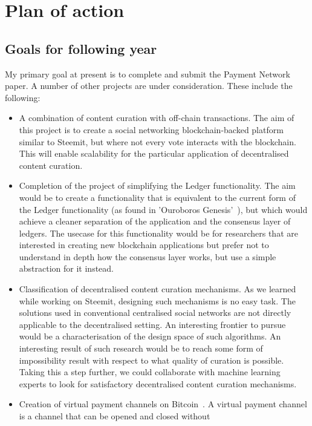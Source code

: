 \section{Plan of action}
  \subsection{Goals for following year}
    My primary goal at present is to complete and submit the Payment Network
    paper. A number of other projects are under consideration. These include the
    following:
    \begin{itemize}
      \item A combination of content curation with off-chain transactions. The
      aim of this project is to create a social networking blockchain-backed
      platform similar to Steemit, but where not every vote interacts with the
      blockchain. This will enable scalability for the particular application of
      decentralised content curation.
      \item Completion of the project of simplifying the Ledger functionality.
      The aim would be to create a functionality that is equivalent to the
      current form of the Ledger functionality (as found in 'Ouroboros
      Genesis'~\cite{genesis}), but which would achieve a cleaner separation of
      the application and the consensus layer of ledgers. The usecase for this
      functionality would be for researchers that are interested in creating new
      blockchain applications but prefer not to understand in depth how the
      consensus layer works, but use a simple abstraction for it instead.
      \item Classification of decentralised content curation mechanisms. As we
      learned while working on Steemit, designing such mechanisms is no easy
      task. The solutions used in conventional centralised social networks are
      not directly applicable to the decentralised setting. An interesting
      frontier to pursue would be a characterisation of the design space of such
      algorithms. An interesting result of such research would be to reach some
      form of impossibility result with respect to what quality of curation is
      possible. Taking this a step further, we could collaborate with machine
      learning experts to look for satisfactory decentralised content curation
      mechanisms.
      \item Creation of virtual payment channels on Bitcoin~\cite{bitcoin}. A
      virtual payment channel is a channel that can be opened and closed without

\end{itemize}
